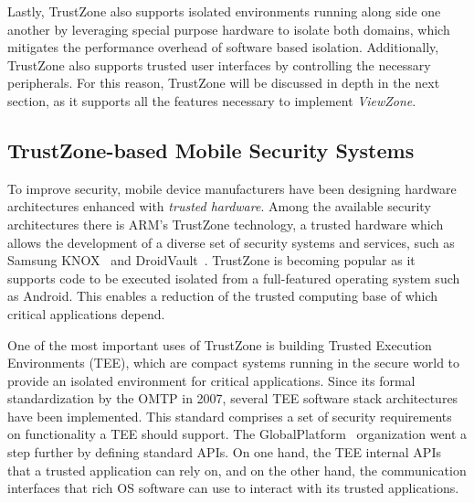 Lastly, TrustZone also supports isolated environments running along side one another by leveraging special purpose hardware to isolate both domains, which mitigates the performance overhead of software based isolation. Additionally, TrustZone also supports trusted user interfaces by controlling the necessary peripherals. For this reason, TrustZone will be discussed in depth in the next section, as it supports all the features necessary to implement \emph{ViewZone}.

\subsection{TrustZone-based Mobile Security Systems}
\label{sec:trustzone}

To improve security, mobile device manufacturers have been designing hardware architectures enhanced with \emph{trusted hardware}. Among the available security architectures there is ARM's TrustZone technology, a trusted hardware which allows the development of a diverse set of security systems and services, such as Samsung KNOX~\cite{knox_whitepaper} and DroidVault~\cite{li2014droidvault}. TrustZone is becoming popular as it supports code to be executed isolated from a full-featured operating system such as Android. This enables a reduction of the trusted computing base of which critical applications depend.

One of the most important uses of TrustZone is building Trusted Execution Environments (TEE), which are compact systems running in the secure world to provide an isolated environment for critical applications. Since its formal standardization by the OMTP in 2007, several \ac{TEE} software stack architectures have been implemented. This standard comprises a set of security requirements on functionality a TEE should support. The GlobalPlatform~\cite{global} organization went a step further by defining standard APIs. On one hand, the TEE internal APIs that a trusted application can rely on, and on the other hand, the communication interfaces that rich OS software can use to interact with its trusted applications.


